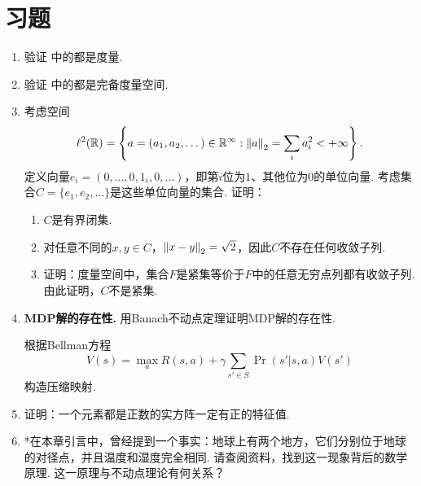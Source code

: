 \section{习题}

\begin{enumerate}[wide, labelindent=0pt]
    \item \label{exercise:metric} 验证 中的都是度量. 
    
    \item \label{exercise:complete-metric-space} 验证 中的都是完备度量空间. 
    
    \item \label{exercise:compact-not-bounded-closed} 考虑空间
    \[\ell^2(\mathbb{R})=\left\{a=(a_1,a_2,\dots)\in\mathbb{R}^{\infty}:\left\|a\right\|_2=\sum_{i}a_i^2<+\infty\right\}.\]
    定义向量$e_i=(0,\dots,0,1_i,0,\dots)$，即第$i$位为$1$、其他位为$0$的单位向量. 考虑集合$C=\{e_1,e_2,\dots\}$是这些单位向量的集合. 证明：
    \begin{enumerate}
        \item $C$是有界闭集. 
        \item 对任意不同的$x,y\in C$，$\left\|x-y\right\|_2=\sqrt{2}$，因此$C$不存在任何收敛子列. 
        \item 证明：度量空间中，集合$F$是紧集等价于$F$中的任意无穷点列都有收敛子列. 由此证明，$C$不是紧集. 
    \end{enumerate}

    \item \textbf{MDP解的存在性.} 用Banach不动点定理证明MDP解的存在性.
    \begin{hint}
    根据Bellman方程
    \[
    V(s) = \max_a R(s, a) + \gamma \sum_{s' \in S} \Pr(s' | s, a) V(s')
    \]
    构造压缩映射.
    \end{hint}

    \item \label{exercise:positive-eigenvalue} 证明：一个元素都是正数的实方阵一定有正的特征值.

    \item *在本章引言中，曾经提到一个事实：地球上有两个地方，它们分别位于地球的对径点，并且温度和湿度完全相同. 请查阅资料，找到这一现象背后的数学原理. 这一原理与不动点理论有何关系？

\end{enumerate}
